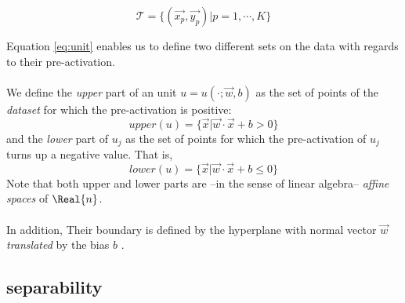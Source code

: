 \begin{equation}\label{eq:dataset}
    \mathcal{T} = \{(\vec{x_p}, \vec{y_p}) | p=1,\cdots,K\}
\end{equation}

Equation \ref{eq:unit} enables us to define two different sets on the data with regards to their pre-activation.  
\\\\
We define the \emph{upper} part of an unit  $u = u(\cdot;\vec{w},b)$ as the set of points of the \emph{dataset} for which the pre-activation is positive:
\begin{equation}\label{eq:upperPartOfUnit}
    upper(u) = \{\vec{x}|\vec{w}\cdot\vec{x}+b>0\}
\end{equation}
and the \emph{lower} part of $u_j$ as the set of points for which the pre-activation of $u_j$ turns up a negative value. That is, 
\begin{equation}\label{eq:lowerPartOfUnit}
    lower(u) = \{\vec{x}|\vec{w}\cdot\vec{x}+b\leq 0\}
\end{equation}
Note that both upper and lower parts are --in the sense of linear algebra-- \emph{affine spaces} of $\Real{n}$\cite{Burges1998TutorialOnSVMForPatternRecognition,florenzano2001ConvexAnalysis}. 
\\\\
In addition, Their boundary is defined by the hyperplane with normal vector $\vec{w}$ \emph{translated} by the bias $b$ \cite{boyd,florenzano2001ConvexAnalysis,Burges1998TutorialOnSVMForPatternRecognition}.

\subsection{\ReLU separability}\label{subsec:ReLUSeparability}

